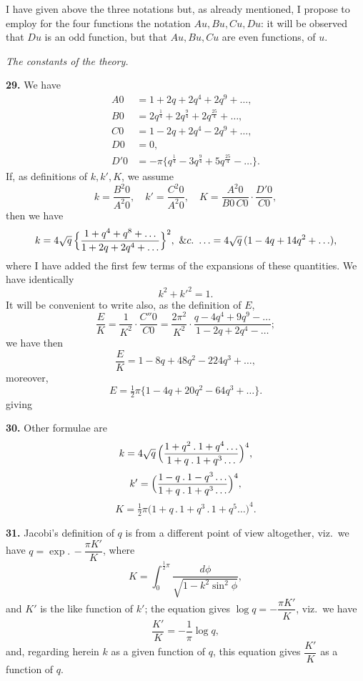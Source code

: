 \documentclass[11pt]{article}
\begin{document}
\medskip

I have given above the three notations but, as already mentioned, I propose to employ for the four functions the notation $Au, Bu, Cu, Du$: it will be observed that $Du$ is an odd function, but that $Au, Bu, Cu$ are even functions, of $u$.

\medskip

\textit{The constants of the theory.}

\medskip

\textbf{29.} We have
\begin{align*}
A0 &= 1 + 2q + 2q^4 + 2q^9 + \ldots,\\
B0 &= 2q^{\tfrac{1}{4}} + 2q^{\tfrac{9}{4}} + 2q^{\tfrac{25}{4}} + \ldots,\\
C0 &= 1 - 2q + 2q^4 - 2q^9 + \ldots,\\
D0 &= 0,\\
D'0 &= -\pi\{q^{\tfrac{1}{4}} - 3q^{\tfrac{9}{4}} + 5q^{\tfrac{25}{4}} - \ldots\}.
\end{align*}
If, as definitions of $k, k', K$, we assume
\[
k = \frac{B^2 0}{A^2 0},\quad k' = \frac{C^2 0}{A^2 0},\quad K = \frac{A^2 0}{B0\, C0}\cdot \frac{D'0}{C0},
\]
then we have
\[
k = 4\sqrt{q}\,\Bigl\{\frac{1 + q^4 + q^8 + \ldots}{1 + 2q + 2q^4 + \ldots}\Bigr\}^2,\ \&c.\ \ldots = 4\sqrt{q}\,(1 - 4q + 14q^2 + \ldots),
\]
where I have added the first few terms of the expansions of these quantities. We have identically
\[
k^2 + k'^2 = 1.
\]
It will be convenient to write also, as the definition of $E$,
\[
\frac{E}{K} = \frac{1}{K^2}\cdot \frac{C''0}{C0} = \frac{2\pi^2}{K^2}\cdot \frac{q - 4q^4 + 9q^9 - \ldots}{1 - 2q + 2q^4 - \ldots};
\]
we have then
\[
\frac{E}{K} = 1 - 8q + 48q^2 - 224q^3 + \ldots,
\]
moreover,
\[
E = \tfrac{1}{2}\pi\bigl\{1 - 4q + 20q^2 - 64q^3 + \ldots\bigr\}.
\]
giving

\medskip

\textbf{30.} Other formulae are
\[
k = 4\sqrt{q}\,\Bigl(\frac{1 + q^2\mathbin{.}1 + q^4 \ldots}{1 + q\mathbin{.}1 + q^3 \ldots}\Bigr)^4,
\]
\[
k' = \Bigl(\frac{1 - q\mathbin{.}1 - q^3 \ldots}{1 + q\mathbin{.}1 + q^3 \ldots}\Bigr)^4,
\]
\[
K = \tfrac{1}{2}\pi\bigl(1 + q\mathbin{.}1 + q^3\mathbin{.}1 + q^5 \ldots\bigr)^4.
\]

\medskip

\textbf{31.} Jacobi's definition of $q$ is from a different point of view altogether, viz.\ we have $q = \exp.\,-\dfrac{\pi K'}{K}$, where
\[
K = \int_0^{\tfrac{1}{2}\pi}\!\frac{d\phi}{\sqrt{1 - k^2\sin^2\phi}},
\]
and $K'$ is the like function of $k'$; the equation gives $\log q = -\dfrac{\pi K'}{K}$, viz.\ we have
\[
\frac{K'}{K} = -\dfrac{1}{\pi}\log q,
\]
and, regarding herein $k$ as a given function of $q$, this equation gives $\dfrac{K'}{K}$ as a function of $q$.
\end{document}
